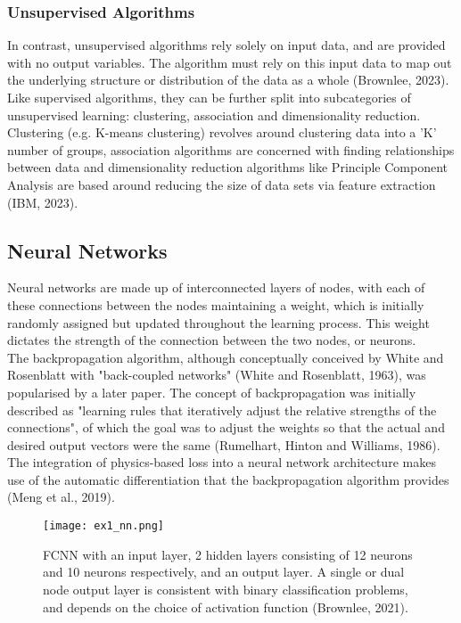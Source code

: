 \documentclass[12pt, openany]{book}
\begin{document}
\subsubsection*{Unsupervised Algorithms}

In contrast, unsupervised algorithms rely solely on input data, and are provided with no output variables. The algorithm must rely on this input data to map out the underlying structure or distribution of the data as a whole (Brownlee, 2023). Like supervised algorithms, they can be further split into subcategories of unsupervised learning: clustering, association and dimensionality reduction. Clustering (e.g. K-means clustering) revolves around clustering data into a 'K' number of groups, association algorithms are concerned with finding relationships between data and dimensionality reduction algorithms like Principle Component Analysis are based around reducing the size of data sets via feature extraction (IBM, 2023).

\subsection{Neural Networks}

Neural networks are made up of interconnected layers of nodes, with each of these connections between the nodes maintaining a weight, which is initially randomly assigned but updated throughout the learning process. This weight dictates the strength of the connection between the two nodes, or neurons. \\ 

The backpropagation algorithm, although conceptually conceived by White and Rosenblatt with "back-coupled networks" (White and Rosenblatt, 1963), was popularised by a later paper. The concept of backpropagation was initially described as "learning rules that iteratively adjust the relative strengths of the connections", of which the goal was to adjust the weights so that the actual and desired output vectors were the same (Rumelhart, Hinton and Williams, 1986). The integration of physics-based loss into a neural network architecture makes use of the automatic differentiation that the backpropagation algorithm provides (Meng et al., 2019).

\begin{figure} [h!]
    \centering
    \texttt{[image: ex1\_nn.png]}
    \caption{%
    FCNN with an input layer, 2 hidden layers consisting of 12 neurons and 10 neurons respectively, and an output layer. A single or dual node output layer is consistent with binary classification problems, and depends on the choice of activation function (Brownlee, 2021).}
    \label{fig:enter-label}
\end{figure}
\end{document}
